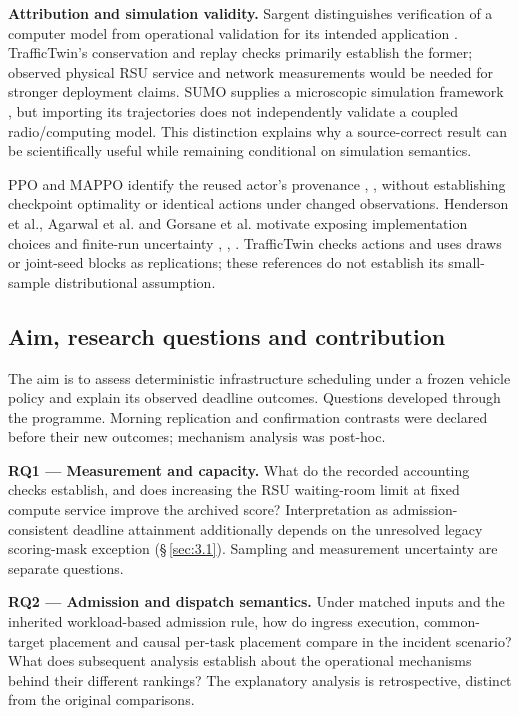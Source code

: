 \documentclass[11pt,a4paper]{article}
\begin{document}
\textbf{Attribution and simulation validity.} Sargent distinguishes verification of a computer model from operational validation for its intended application \cite{ref12}. TrafficTwin's conservation and replay checks primarily establish the former; observed physical RSU service and network measurements would be needed for stronger deployment claims. SUMO supplies a microscopic simulation framework \cite{ref8}, but importing its trajectories does not independently validate a coupled radio/computing model. This distinction explains why a source-correct result can be scientifically useful while remaining conditional on simulation semantics.

PPO and MAPPO identify the reused actor's provenance \cite{ref3}, \cite{ref4}, without establishing checkpoint optimality or identical actions under changed observations. Henderson et al., Agarwal et al. and Gorsane et al. motivate exposing implementation choices and finite-run uncertainty \cite{ref5}, \cite{ref6}, \cite{ref7}. TrafficTwin checks actions and uses draws or joint-seed blocks as replications; these references do not establish its small-sample distributional assumption.

\subsection{Aim, research questions and contribution}\label{sec:1.3}

The aim is to assess deterministic infrastructure scheduling under a frozen vehicle policy and explain its observed deadline outcomes. Questions developed through the programme. Morning replication and confirmation contrasts were declared before their new outcomes; mechanism analysis was post-hoc.

\textbf{RQ1 --- Measurement and capacity.} What do the recorded accounting checks establish, and does increasing the RSU waiting-room limit at fixed compute service improve the archived score? Interpretation as admission-consistent deadline attainment additionally depends on the unresolved legacy scoring-mask exception (\S\,\ref{sec:3.1}). Sampling and measurement uncertainty are separate questions.

\textbf{RQ2 --- Admission and dispatch semantics.} Under matched inputs and the inherited workload-based admission rule, how do ingress execution, common-target placement and causal per-task placement compare in the incident scenario? What does subsequent analysis establish about the operational mechanisms behind their different rankings? The explanatory analysis is retrospective, distinct from the original comparisons.
\end{document}

